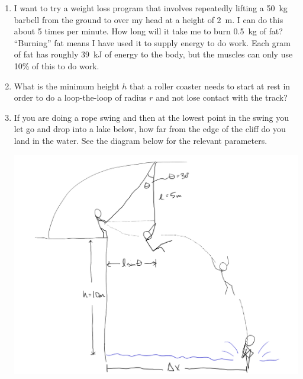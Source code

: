 \begin{enumerate}
\item
I want to try a weight loss program that involves repeatedly lifting a \SI{50}{kg} barbell from the ground to over my head at a height of \SI{2}{\meter}. I can do this about 5 times per minute. How long will it take me to burn \SI{0.5}{kg} of fat? ``Burning'' fat means I have used it to supply energy to do work. Each gram of fat has roughly \SI{39}{\kilo\joule} of energy to the body, but the muscles can only use 10\% of this to do work. 

\item What is the minimum height $h$ that a roller coaster needs to start at rest in order to do a loop-the-loop of radius $r$ and not lose contact with the track?


\item 
If you are doing a rope swing and then at the lowest point in the swing you let go and drop into a lake below, how far from the edge of the cliff do you land in the water. See the diagram below for the relevant parameters.

\includegraphics[scale=0.1]{week7-rope-swing.png}



\end{enumerate}